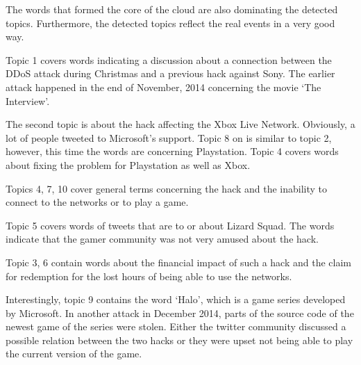 The words that formed the core of the cloud are also dominating the detected topics. Furthermore, the detected topics reflect the real events in a very good way.

Topic 1 covers words indicating a discussion about a connection between the DDoS attack during Christmas and a previous hack against Sony. The earlier attack happened in the end of November, 2014 concerning the movie ‘The Interview’.\cite{bbc2014the}

The second topic is about the hack affecting the Xbox Live Network. Obviously, a lot of people tweeted to Microsoft's support.
Topic 8 on is similar to topic 2, however, this time the words are concerning Playstation.
Topic 4 covers words about fixing the problem for Playstation as well as Xbox.

Topics 4, 7, 10 cover general terms concerning the hack and the inability to connect to the networks or to play a game.

Topic 5 covers words of tweets that are to or about Lizard Squad. The words indicate that the gamer community was not very amused about the hack.

Topic 3, 6 contain words about the financial impact of such a hack and the claim for redemption for the lost hours of being able to use the networks.

Interestingly, topic 9 contains the word ‘Halo’, which is a game series developed by Microsoft. In another attack in December 2014, parts of the source code of the newest game of the series were stolen. Either the twitter community discussed a possible relation between the two hacks or they were upset not being able to play the current version of the game.\cite{griffin2014unreleased}